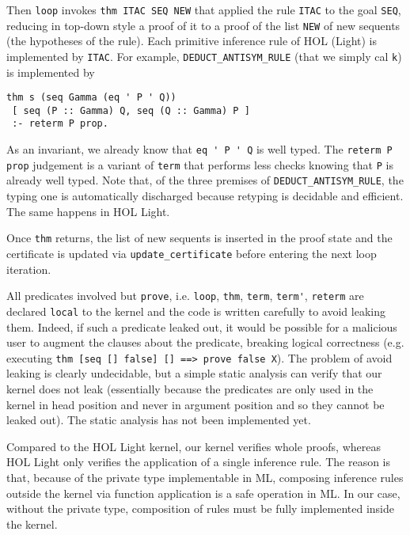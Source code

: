 \documentclass[preprint]{sigplanconf}
\begin{document}
Then \verb+loop+ invokes \verb+thm ITAC SEQ NEW+ that applied the rule \verb+ITAC+ to the goal \verb+SEQ+, reducing in top-down style a proof of it to a proof of the list \verb+NEW+ of new sequents (the hypotheses of the rule). Each primitive inference rule of HOL (Light) is implemented by \verb+ITAC+. For example, \verb+DEDUCT_ANTISYM_RULE+ (that we simply cal \verb+k+) is implemented by

{\small
\begin{verbatim}
thm s (seq Gamma (eq ' P ' Q))
 [ seq (P :: Gamma) Q, seq (Q :: Gamma) P ]
 :- reterm P prop.
\end{verbatim}}

As an invariant, we already know that \verb+eq ' P ' Q+ is well typed. The \verb+reterm P prop+ judgement is a variant of \verb+term+ that performs less checks knowing that \verb+P+ is already well typed. Note that, of the three premises of \verb+DEDUCT_ANTISYM_RULE+, the typing one is automatically discharged because retyping is decidable and efficient. The same happens in HOL Light.

Once \verb+thm+ returns, the list of new sequents is inserted in the
proof state and the certificate is updated via \verb+update_certificate+ before entering the next loop iteration.

All predicates involved but \verb+prove+, i.e. \verb+loop+, \verb+thm+, \verb+term+, \verb+term'+, \verb+reterm+ are declared \verb+local+ to the kernel and the code is written carefully to avoid leaking them. Indeed, if such a predicate leaked out, it would be possible for a malicious user to augment the clauses about the predicate, breaking logical correctness (e.g. executing \verb+thm [seq [] false] [] ==> prove false X+). The problem of avoid leaking is clearly undecidable, but a simple static analysis can verify that our kernel does not leak (essentially because the predicates are only used in the kernel in head position and never in argument position and so they cannot be leaked out). The static analysis has not been implemented yet.

Compared to the HOL Light kernel, our kernel verifies whole proofs, whereas HOL Light only verifies the application of a single inference rule. The reason is that, because of the private type implementable in ML, composing inference rules outside the kernel via function application is a safe operation in ML. In our case, without the private type, composition of rules must be fully implemented inside the kernel.
\end{document}
